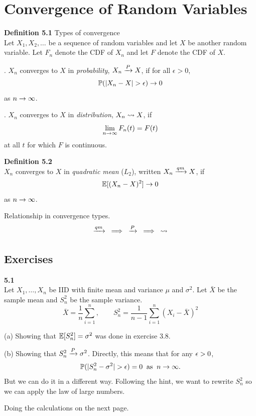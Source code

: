 
\newpage
\section{Convergence of Random Variables}

\medskip\noindent\textbf{Definition 5.1} Types of convergence\\
Let $X_1,X_2,\ldots$ be a sequence of random variables and let $X$ be another
random variable. Let $F_n$ denote the CDF of $X_n$ and let $F$ denote the CDF of $X$.

\medskip{}. $X_n$ converges to $X$ in \emph{probability}, $X_n\xrightarrow{P} X$, if for all $\epsilon > 0$,
$$
\mathbb{P}(|X_n - X| > \epsilon)\rightarrow 0
$$
as $n\rightarrow\infty$.

\medskip{}. $X_n$ converges to $X$ in \emph{distribution}, $X_n\rightsquigarrow X$, if
$$
\lim_{n\rightarrow\infty}F_n(t) = F(t)
$$
at all $t$ for which $F$ is continuous.

\medskip\noindent\textbf{Definition 5.2}\\
$X_n$ converges to $X$ in \emph{quadratic mean} ($L_2$), written $X_n\xrightarrow{qm} X$, if
$$
\mathbb{E}[(X_n - X)^2]\rightarrow 0
$$
as $n\rightarrow\infty$.

\medskip\noindent
Relationship in convergence types.
$$
\xrightarrow{qm} \;\;\implies\;\; \xrightarrow{P} \;\;\implies\;\; \rightsquigarrow
$$

\subsection*{Exercises}
\textbf{5.1}\\  %
Let $X_1,\ldots, X_n$ be IID with finite mean and variance $\mu$ and $\sigma^2$.
Let $\bar{X}$ be the sample mean and $S_n^2$ be the sample variance.
$$
\bar{X} = \frac{1}{n}\sum_{i=1}^n,
\qquad
S_n^2 = \frac{1}{n-1}\sum_{i=1}^n(X_i - \bar{X})^2
$$

\medskip\noindent(a) Showing that $\mathbb{E}[S_n^2] = \sigma^2$ was done in exercise 3.8.

\medskip\noindent(b) Showing that $S_n^2\xrightarrow{P}\sigma^2$. Directly, this means that for any $\epsilon>0$,
$$
\mathbb{P}(|S_n^2 - \sigma^2| > \epsilon) = 0 \;\;\text{as}\;\; n\rightarrow\infty.
$$
But we can do it in a different way. Following the hint, we want to rewrite $S_n^2$
so we can apply the law of large numbers.

\medskip\noindent
Doing the calculations on the next page.

